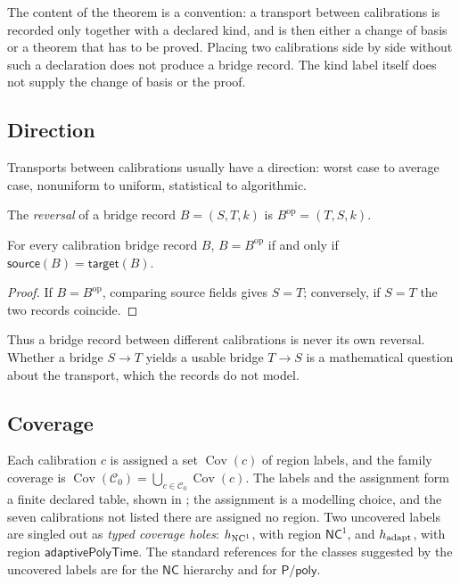 The content of the theorem is a convention: a transport between
calibrations is recorded only together with a declared kind, and is
then either a change of basis or a theorem that has to be proved.
Placing two calibrations side by side without such a declaration does
not produce a bridge record.  The kind label itself does not supply
the change of basis or the proof.

\subsection{Direction}\label{sec:calibration:bridge-type-direction}

Transports between calibrations usually have a direction: worst case to
average case, nonuniform to uniform, statistical to algorithmic.

\begin{definition}\label{def:calibration-bridge-reversal}
The \emph{reversal} of a bridge record \(B=(S,T,k)\) is
\(B^{\mathrm{op}}=(T,S,k)\).
\end{definition}

\begin{theorem}\label{thm:bridge-type-direction}
For every calibration bridge record \(B\),
\(B=B^{\mathrm{op}}\) if and only if
\(\mathsf{source}(B)=\mathsf{target}(B)\).
\end{theorem}

\begin{proof}
If \(B=B^{\mathrm{op}}\), comparing source fields gives \(S=T\);
conversely, if \(S=T\) the two records coincide.
\end{proof}

Thus a bridge record between different calibrations is never its own
reversal.  Whether a bridge \(S\to T\) yields a usable bridge
\(T\to S\) is a mathematical question about the transport, which the
records do not model.

\subsection{Coverage}\label{sec:calibration:coverage-family-geometry}

Each calibration \(c\) is assigned a set \(\operatorname{Cov}(c)\) of
region labels, and the family coverage is
\(\operatorname{Cov}(\mathcal C_{0})=\bigcup_{c\in\mathcal C_{0}}\operatorname{Cov}(c)\).
The labels and the assignment form a finite declared table, shown in
; the assignment is a modelling choice, and
the seven calibrations not listed there are assigned no region.  Two uncovered labels are singled out as
\emph{typed coverage holes}: \(h_{\mathrm{NC}^{1}}\), with region
\(\mathsf{NC}^{1}\), and \(h_{\mathrm{adapt}}\), with region
\(\mathsf{adaptivePolyTime}\).  The standard references for the classes
suggested by the uncovered labels are \cite{Cook1985NCTaxonomy} for the
\(\mathsf{NC}\) hierarchy and \cite{KarpLipton1982Advice} for
\(\mathsf{P/poly}\).

